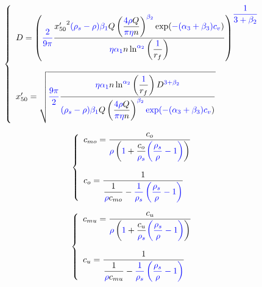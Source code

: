 \documentclass[12pt,reqno,intlimits,twoside]{amsart}
\begin{document}
\begin{equation}\label{EqDxRed50} %
   \left\{
   \begin{array}{l}
      D = \left( \textcolor{blue}{\dfrac{2}{9\pi}}
                 \dfrac{{x'_{50}}^{2}\textcolor{blue}{(\rho_s - \rho)\beta_1}Q%
                        \left(\dfrac{\textcolor{blue}{4\rho}Q}{\textcolor{blue}{\pi\eta}n}\right)^{\textcolor{blue}{\beta_2}}%
                        \exp(\textcolor{blue}{-(\alpha_3 + \beta_3)c_v})}%
                       {\textcolor{blue}{\eta\alpha_1}n\ln^{\textcolor{blue}{\alpha_2}}\left(\dfrac{\textcolor{blue}{1}}{r_f}\right)}
          \right)^{\textcolor{blue}{\dfrac{1}{3 + \beta_2}}}\\
   \phantom{\strut}\\
   x'_{50} = \sqrt{ \strut\textcolor{blue}{\dfrac{9\pi}{2}}
                    \dfrac{\textcolor{blue}{\eta\alpha_1}n\ln^{\textcolor{blue}{\alpha_2}}\left(\dfrac{\textcolor{blue}{1}}{r_f}\right)%
                           D^{\textcolor{blue}{3 + \beta_2}}%
                          }%
                          {\textcolor{blue}{(\rho_s - \rho)\beta_1}Q%
                           \left(\dfrac{\textcolor{blue}{4\rho}Q}{\textcolor{blue}{\pi\eta}n}\right)^{\textcolor{blue}{\beta_2}}%
                           \textcolor{blue}{\exp(-(\alpha_3 + \beta_3)c_v})%
                          }
                  }
   \end{array}
   \right.
\end{equation}

\begin{equation}\label{EqCmoCo} %
   \left\{
   \begin{array}{l}
      c_{mo} = \dfrac{c_o}%
                     {\textcolor{blue}{\rho}%
                     \left(\textcolor{blue}{1} + \dfrac{c_o}{\textcolor{blue}{\rho_s}}%
                     \textcolor{blue}{\left(\dfrac{\rho_s}{\rho} - 1\right)}%
                     \right)%
                     }\\
      \phantom{\strut}\\
      c_o =   \dfrac{1}%
                    {\dfrac{1}{\textcolor{blue}{\rho}c_{mo}} - %
                    \textcolor{blue}{\dfrac{1}{\rho_s}\left(\dfrac{\rho_s}{\rho} - 1\right)}%
                    }
   \end{array}
   \right.
\end{equation}

\begin{equation}\label{EqCmuCu} %
   \left\{
   \begin{array}{l}
      c_{mu} = \dfrac{c_u}%
                     {\textcolor{blue}{\rho}%
                     \left(\textcolor{blue}{1} + \dfrac{c_u}{\textcolor{blue}{\rho_s}}%
                     \textcolor{blue}{\left(\dfrac{\rho_s}{\rho} - 1\right)}%
                     \right)%
                     }\\
      \phantom{\strut}\\
      c_u =   \dfrac{1}%
                    {\dfrac{1}{\textcolor{blue}{\rho}c_{mu}} - %
                    \textcolor{blue}{\dfrac{1}{\rho_s}\left(\dfrac{\rho_s}{\rho} - 1\right)}%
                    }
   \end{array}
   \right.
\end{equation}
\end{document}
